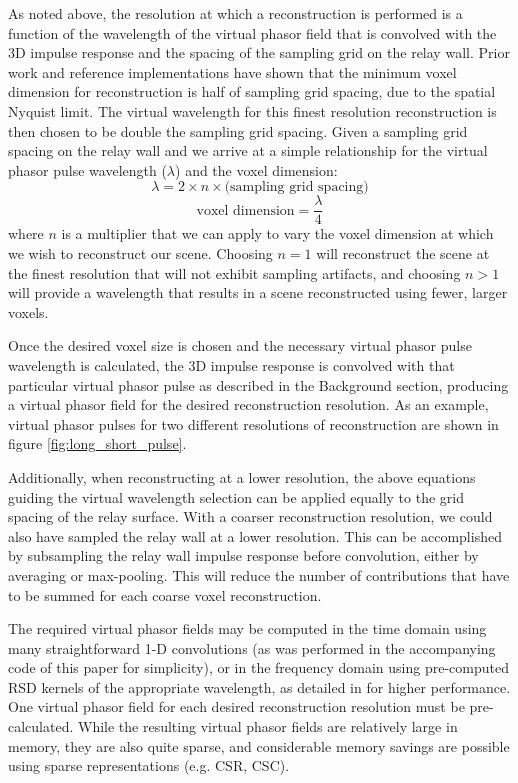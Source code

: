 \documentclass[conference]{IEEEtran}
\begin{document}
As noted above, the resolution at which a reconstruction is performed is a function of the wavelength of the virtual phasor field that is convolved with the 3D impulse response and the spacing of the sampling grid on the relay wall. Prior work and reference implementations \cite{Liu2019} have shown that the minimum voxel dimension for reconstruction is half of sampling grid spacing, due to the spatial Nyquist limit. The virtual wavelength for this finest resolution reconstruction is then chosen to be double the sampling grid spacing. Given a sampling grid spacing on the relay wall and we arrive at a simple relationship for the virtual phasor pulse wavelength ($\lambda$) and the voxel dimension:
$$ \lambda = 2 \times n \times \text{(sampling grid spacing)} $$
$$ \text{voxel dimension} = \frac{\lambda}{4} $$
where $n$ is a multiplier that we can apply to vary the voxel dimension at which we wish to reconstruct our scene. Choosing $n=1$ will reconstruct the scene at the finest resolution that will not exhibit sampling artifacts, and choosing $n>1$ will provide a wavelength that results in a scene reconstructed using fewer, larger voxels.

Once the desired voxel size is chosen and the necessary virtual phasor pulse wavelength is calculated, the 3D impulse response is convolved with that particular virtual phasor pulse as described in the Background section, producing a virtual phasor field for the desired reconstruction resolution. As an example, virtual phasor pulses for two different resolutions of reconstruction are shown in figure \ref{fig:long_short_pulse}. 

Additionally, when reconstructing at a lower resolution, the above equations guiding the virtual wavelength selection can be applied equally to the grid spacing of the relay surface. With a coarser reconstruction resolution, we could also have sampled the relay wall at a lower resolution. This can be accomplished by subsampling the relay wall impulse response before convolution, either by averaging or max-pooling. This will reduce the number of contributions that have to be summed for each coarse voxel reconstruction.

The required virtual phasor fields may be computed in the time domain using many straightforward 1-D convolutions (as was performed in the accompanying code of this paper for simplicity), or in the frequency domain using pre-computed RSD kernels of the appropriate wavelength, as detailed in \cite{Liu2019} for higher performance. One virtual phasor field for each desired reconstruction resolution must be pre-calculated. While the resulting virtual phasor fields are relatively large in memory, they are also quite sparse, and considerable memory savings are possible using sparse representations (e.g. CSR, CSC).
\end{document}
